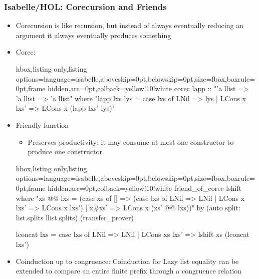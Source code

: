 \documentclass[aspectratio=169,10pt]{beamer}
\begin{document}
\begin{frame}[fragile]
  \frametitle{Isabelle/HOL: Corecursion and Friends}
  \begin{itemize}
          \item Corecursion is like recursion, but instead of always eventually reducing an argument it always eventually produces something
          \pause
    \item Corec:
\vspace*{-1ex}
\begin{tcblisting}{hbox,listing only,listing options={language=isabelle,aboveskip=0pt,belowskip=0pt},size=fbox,boxrule=0pt,frame hidden,arc=0pt,colback=yellow!10!white}
corec lapp :: "'a llist => 'a llist => 'a llist" where
  "lapp lxs lys = case lxs of LNil => lys | LCons x lxs' => LCons x (lapp lxs' lys)"
\end{tcblisting}
\vspace*{-1ex}
          \pause
    \item Friendly function
          \begin{itemize}
            \item Preserves productivity: it may consume at most one constructor to produce one constructor.
          \end{itemize}
\vspace*{-1ex}
\begin{tcblisting}{hbox,listing only,listing options={language=isabelle,aboveskip=0pt,belowskip=0pt},size=fbox,boxrule=0pt,frame hidden,arc=0pt,colback=yellow!10!white}
friend_of_corec lshift where
  "xs @@ lxs = (case xs of
    [] => (case lxs of LNil => LNil | LCons x lxs' => LCons x lxs')
  | x#xs' => LCons x (xs' @@ lxs))"
  by (auto split: list.splits llist.splits) (transfer_prover)

lconcat lxs = case lxs of LNil => LNil | LCons xs lxs' => lshift xs (lconcat lxs')
\end{tcblisting}
\vspace*{-1ex}
          \pause
          \item Coinduction up to congruence: Coinduction for Lazy list equality can be extended to compare an entire finite prefix through a congruence relation
  \end{itemize}
\end{frame}
\end{document}
